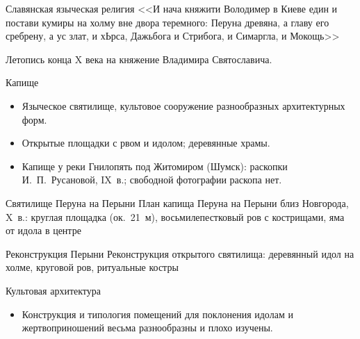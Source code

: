 \begin{frame}{Славянская языческая религия}
  <<И нача княжити Володимер в Киеве един и постави кумиры на холму вне двора теремного: Перуна древяна, а главу его сребрену, а ус злат, и хЬрса, Дажьбога и Стрибога, и Симаргла, и Мокощь>>

  Летопись конца X века на княжение Владимира Святославича.
\end{frame}

\begin{frame}{Капище}
  \begin{itemize}
    \item Языческое святилище, культовое сооружение
          разнообразных архитектурных форм.
    \item Открытые площадки с рвом и идолом; деревянные храмы.
    \item Капище у реки Гнилопять под Житомиром (Шумск):
          раскопки И.~П.~Русановой, IX~в.;
          свободной фотографии раскопа нет.
  \end{itemize}
\end{frame}

\begin{frame}{Святилище Перуна на Перыни}
    {План капища Перуна на Перыни близ Новгорода, X~в.:
     круглая площадка (ок.\ 21~м), восьмилепестковый ров
     с кострищами, яма от идола в центре}
\end{frame}

\begin{frame}{Реконструкция Перыни}
    {Реконструкция открытого святилища: деревянный идол на холме,
     круговой ров, ритуальные костры}
\end{frame}

\begin{frame}{Культовая архитектура}
  \begin{itemize}
    \item Конструкция и типология помещений для поклонения идолам и жертвоприношений весьма разнообразны и плохо изучены.
  \end{itemize}
\end{frame}

